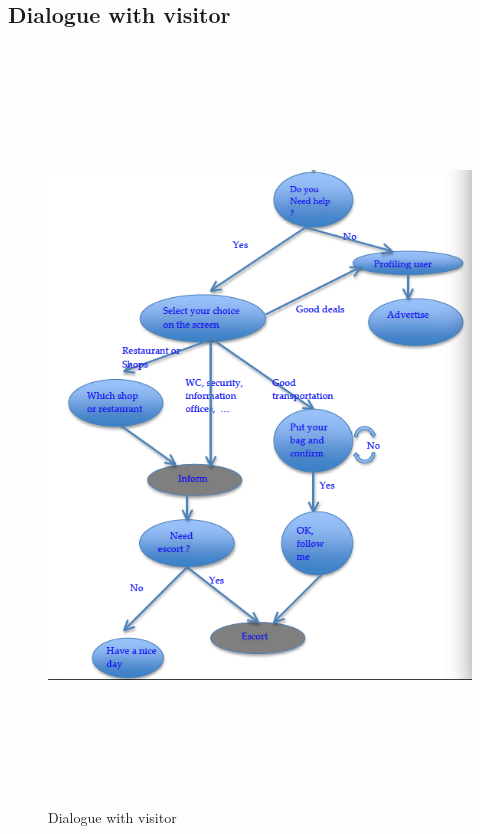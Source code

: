 \documentclass{article}
\begin{document}
\subsection{Dialogue with visitor}
\begin{figure}[htbp]
\begin{center}
\includegraphics[height=20cm]{fig/VisitorDialogueII}
\caption{Dialogue with visitor}
\label{FigVisitorDialogue}
\end{center}
\end{figure}
\end{document}
